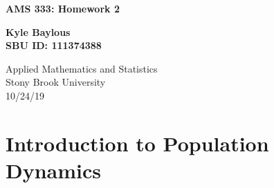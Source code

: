 \documentclass[12pt]{article}
\begin{document}
 

\begin{titlepage}
   \begin{center}
   
       \vspace*{1cm}
 
       \textbf{\Large{AMS 333: Homework 2}}
 
       \vspace{0.5cm}
 
       \vspace{1.5cm}
 
       \textbf{\Large{Kyle Baylous}}\\
       \vspace{1.5cm}
       \textbf{\Large{SBU ID: 111374388}}
 
       \vfill

 
       \vspace{0.8cm}
 
 
       Applied Mathematics and Statistics\\
       Stony Brook University\\
       10/24/19
 
   \end{center}
\end{titlepage}

\section{Introduction to Population Dynamics}
\end{document}
